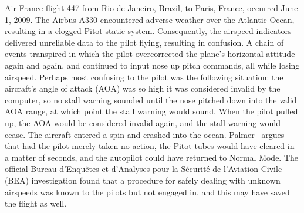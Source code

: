 Air France flight 447 from Rio de Janeiro, Brazil, to Paris, France, occurred June 1, 2009. The Airbus A330 encountered adverse weather over the Atlantic Ocean, resulting in a clogged Pitot-static system. Consequently, the airspeed indicators delivered unreliable data to the pilot flying, resulting in confusion. A chain of events transpired in which the pilot overcorrected the plane's horizontal attitude again and again, and continued to input nose up pitch commands, all while losing airspeed. Perhaps most confusing to the pilot was the following situation: the aircraft's  angle of attack (AOA) was so high it was considered invalid by the computer, so no stall warning sounded until the nose pitched down into the valid AOA range, at which point the stall warning would sound. When the pilot pulled up, the AOA would be considered invalid again, and the stall warning would cease. The aircraft entered a spin and crashed into the ocean. Palmer~\cite{AFPalmer} argues that had the pilot merely taken no action, the Pitot tubes would have cleared in a matter of seconds, and the autopilot could have returned to Normal Mode. The official Bureau d'Enqu\^etes et d'Analyses pour la S\'ecurit\'e de l'Aviation Civile (BEA) investigation found that a procedure for safely dealing with unknown airspeeds was known to the pilots but not engaged in, and this may have saved the flight as well.


